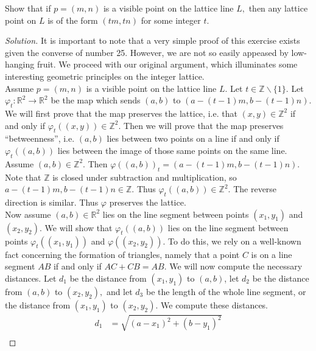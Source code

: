 \documentclass[12pt]{article}
\newcommand{\Z}{\mathbb{Z}}
\newcommand{\R}{\mathbb{R}}
\newenvironment{exercise}[2][Exercise]{\begin{trivlist}
        \item[\hskip \labelsep {\bfseries #1}\hskip \labelsep {\bfseries #2.}]}{\end{trivlist}}
\newenvironment{solution}
        {\begin{proof}[Solution]}
                    {\end{proof}}
\begin{document}
\begin{exercise}{26}
    Show that if \( p = ( m,n ) \) is a visible point on the lattice line \( L, \) then any lattice point on \( L \) is of the form \( ( tm,tn ) \) for some integer \( t. \)
    \begin{solution}
        It is important to note that a very simple proof of this exercise exists given the converse of number 25. However, we are not so easily appeased by low-hanging fruit. We proceed with our original argument, which illuminates some interesting geometric principles on the integer lattice.\\ [1ex]
        Assume \( p = ( m,n ) \) is a visible point on the lattice line \( L. \) Let \( t \in \Z \backslash \{ 1 \} . \) Let \( \varphi_{t}  : \R^{2} \to \R^{2} \) be the map which sends \( ( a,b ) \) to \( ( a - (t-1)m ,b - (t-1)n)  \). We will first prove that the map preserves the lattice, i.e. that \( ( x,y ) \in \Z^{2} \) if and only if \( \varphi_{t}(( x,y )) \in \Z^{2}  \). Then we will prove that the map preserves ``betweenness'', i.e. \( ( a,b ) \) lies between two points on a line if and only if \( \varphi_{t} (( a,b )) \) lies between the image of those same points on the same line.\\ [1ex]
        Assume \( ( a,b ) \in \Z^{2} . \) Then \( \varphi(( a,b ))_{t}  = ( a - (t-1)m, b-(t-1)n ) . \) Note that \( \Z \) is closed under subtraction and multiplication, so \( a-(t-1)m, b-(t-1)n \in \Z. \) Thus \( \varphi_{t} (( a,b )) \in \Z^{2} . \) The reverse direction is similar. Thus \( \varphi \) preserves the lattice.\\ [1ex]
        Now assume \( ( a,b ) \in \R^{2} \) lies on the line segment between points \((x_{1} , y_{1}) \) and \( ( x_{2} , y_{2} ) . \) We will show that \( \varphi_{t}(( a,b )) \) lies on the line segment between points \( \varphi_{t}(( x_{1} , y_{1} )) \) and \( \varphi(( x_{2} , y_{2} )) \). To do this, we rely on a well-known fact concerning the formation of triangles, namely that a point \( C \) is on a line segment \( AB \) if and only if \( AC + CB = AB. \) We will now compute the necessary distances. Let \( d_{1} \) be the distance from \( ( x_{1} , y_{1} ) \) to \( ( a,b ) \), let \( d_{2}  \) be the distance from \( ( a,b ) \) to \( ( x_{2} , y_{2} ) , \) and let \( d_{3} \) be the length of the whole line segment, or the distance from \( ( x_{1} , y_{1} ) \) to \( ( x_{2}, y_{2} ) . \) We compute these distances.
        \begin{align*}
            d_{1} &= \sqrt{( a-x_{1} )^{2} + ( b-y_{1} )^{2}} \\

\end{align*}
\end{solution}
\end{exercise}
\end{document}
